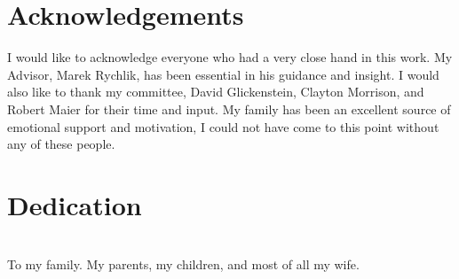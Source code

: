 \thispagestyle{empty}
\maketitle

\thispagestyle{empty}
\iffinal
\chapter*{Acknowledgements}
I would like to acknowledge everyone who had a very close hand in this work. 
My Advisor, Marek Rychlik, has been essential in his guidance and insight. I would also like to thank my committee, David Glickenstein, Clayton Morrison, and Robert Maier for their time and input. My family has been an excellent source of emotional support and motivation, I could not have come to this point without any of these people.

\newpage


\thispagestyle{empty}
\chapter*{Dedication}
\begin{center}
	\ \\
	To my family. My parents, my children, and most of all my wife. 
\end{center}
\newpage
\fi


\tableofcontents
\let\tableofcontents\relax

\listoffigures
\let\listoffigures\relax

\listoftables
\let\listoftables\relax

\newpage


